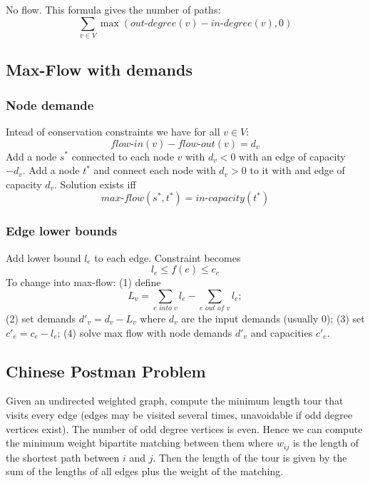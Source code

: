 No flow. This formula gives the number of paths:
$$
\sum_{v \in V} \max \left( \textit{out-degree}(v) - \textit{in-degree}(v), 0 \right)
$$

\subsection{Max-Flow with demands}

\subsubsection{Node demande}

Intead of conservation constraints we have for all $v \in V$:
$$
\textit{flow-in}(v) - \textit{flow-out}(v) = d_v 
$$
Add a node $s^*$ connected to each node $v$ with $d_v < 0$ with an
edge of capacity $-d_v$. Add a node $t^*$ and connect each node with
$d_v > 0$ to it with and edge of capacity $d_v$. Solution exists iff
$$
\textit{max-flow}(s^*, t^*) = \textit{in-capacity}(t^*)
$$

\subsubsection{Edge lower bounds}

Add lower bound $l_e$ to each edge. Constraint becomes
$$
l_e \leq f(e) \leq c_e
$$
To change into max-flow: (1) define
$$
L_v = \sum_{e \textit{ into } v} l_e - \sum_{e \textit{ out of } v} l_e;
$$
(2) set demands $d'_v = d_v - L_v$ where $d_v$ are the input demands (usually $0$);
(3) set $c'_e = c_e - l_e$; (4) solve max flow with node demands $d'_v$ and 
capacities $c'_e$.


\subsection{Chinese Postman Problem}

Given an undirected weighted graph, compute the minimum length tour that visits every edge (edges may be visited several times, unavoidable if odd degree vertices exist). The number of odd degree vertices is even. Hence we can compute the minimum weight bipartite matching between them where $w_{ij}$ is the length of the shortest path between $i$ and $j$. Then the length of the tour is given by the sum of the lengths of all edges plus the weight of the matching.